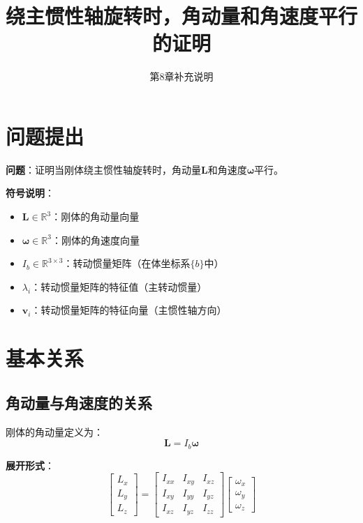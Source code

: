 \documentclass[12pt,a4paper]{article}
\title{绕主惯性轴旋转时，角动量和角速度平行的证明}
\author{第8章补充说明}
\date{}
\begin{document}
\maketitle

\section{问题提出}

\textbf{问题}：证明当刚体绕主惯性轴旋转时，角动量$\bm{L}$和角速度$\bm{\omega}$平行。

\textbf{符号说明}：
\begin{itemize}
\item $\bm{L} \in \mathbb{R}^3$：刚体的角动量向量
\item $\bm{\omega} \in \mathbb{R}^3$：刚体的角速度向量
\item $I_b \in \mathbb{R}^{3 \times 3}$：转动惯量矩阵（在体坐标系$\{b\}$中）
\item $\lambda_i$：转动惯量矩阵的特征值（主转动惯量）
\item $\bm{v}_i$：转动惯量矩阵的特征向量（主惯性轴方向）
\end{itemize}

\section{基本关系}

\subsection{角动量与角速度的关系}

刚体的角动量定义为：
\begin{equation}
\bm{L} = I_b \bm{\omega}
\label{eq:angular_momentum}
\end{equation}

\textbf{展开形式}：
\begin{equation}
\begin{bmatrix}
L_x \\
L_y \\
L_z
\end{bmatrix} = \begin{bmatrix}
I_{xx} & I_{xy} & I_{xz} \\
I_{xy} & I_{yy} & I_{yz} \\
I_{xz} & I_{yz} & I_{zz}
\end{bmatrix} \begin{bmatrix}
\omega_x \\
\omega_y \\
\omega_z
\end{bmatrix}
\end{equation}
\end{document}
